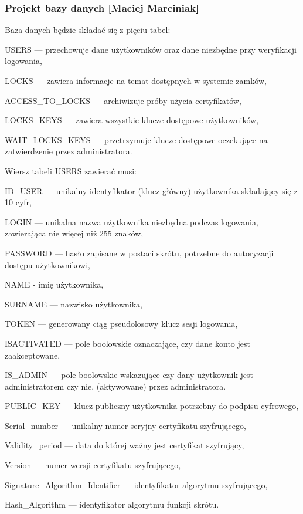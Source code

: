 	\subsubsection[Projekt bazy danych]{Projekt bazy danych [Maciej Marciniak]} 
	Baza danych będzie składać się z pięciu tabel:
	\begin{itemize*}
		\item {USERS} --- przechowuje dane użytkowników oraz dane niezbędne przy weryfikacji logowania,
		\item {LOCKS} --- zawiera informacje na temat dostępnych w systemie zamków,
		\item {ACCESS\_TO\_LOCKS} --- archiwizuje próby użycia certyfikatów,
		\item {LOCKS\_KEYS} --- zawiera wszystkie klucze dostępowe użytkowników,
		\item {WAIT\_LOCKS\_KEYS} --- przetrzymuje klucze dostępowe oczekujące na zatwierdzenie przez administratora.
	\end{itemize*}
	
	Wiersz tabeli USERS zawierać musi:
	\begin{itemize*}
		\item {ID\_USER} --- unikalny identyfikator (klucz główny) użytkownika składający się z 10 cyfr,
		\item {LOGIN} --- unikalna nazwa użytkownika niezbędna podczas logowania, zawierająca nie więcej niż 255 znaków,
		\item {PASSWORD} --- hasło zapisane w postaci skrótu, potrzebne do autoryzacji dostępu użytkownikowi,
		\item {NAME} - imię użytkownika,
		\item {SURNAME} --- nazwisko użytkownika,
		\item {TOKEN} --- generowany ciąg pseudolosowy klucz sesji logowania,
		\item  {ISACTIVATED} --- pole boolowskie oznaczające, czy dane konto jest zaakceptowane,
		\item {IS\_ADMIN} --- pole boolowskie wskazujące czy dany użytkownik jest administratorem czy nie, (aktywowane) przez administratora.
		\item {PUBLIC\_KEY} --- klucz publiczny użytkownika potrzebny do podpisu cyfrowego,
		\item Serial\_number --- unikalny numer seryjny certyfikatu szyfrującego,
		\item Validity\_period --- data do której ważny jest certyfikat szyfrujący,
		\item Version --- numer wersji certyfikatu szyfrującego,
		\item Signature\_Algorithm\_Identifier --- identyfikator algorytmu szyfrującego,
		\item Hash\_Algorithm --- identyfikator algorytmu funkcji skrótu.
	\end{itemize*}
	
